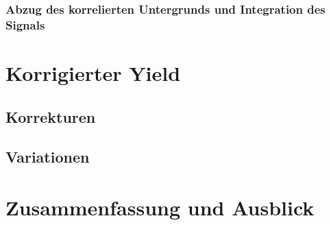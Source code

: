 \documentclass[11pt]{article}
\begin{document}
\subsubsection{Abzug des korrelierten Untergrunds und Integration des Signals} \label{s3s5s4}

\section{Korrigierter Yield} \label{s4}

\subsection{Korrekturen} \label{s4s1}

\subsection{Variationen} \label{s4s2}

\section{Zusammenfassung und Ausblick} \label{s5}
\end{document}
